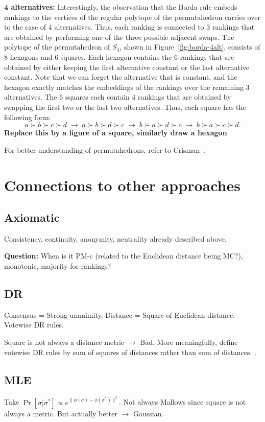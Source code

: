 \documentclass[10pt,letterpaper]{article}
\begin{document}
{\bf $\mathbf{4}$ alternatives:} Interestingly, the observation that the Borda rule embeds rankings to the vertices of the regular polytope of the permutahedron carries over to the case of $4$ alternatives. Thus, each ranking is connected to $3$ rankings that are obtained by performing one of the three possible adjacent swaps. The polytope of the permutahedron of $S_4$, shown in Figure~\ref{fig:borda-4alt}, consists of $8$ hexagons and $6$ squares. Each hexagon contains the $6$ rankings that are obtained by either keeping the first alternative constant or the last alternative constant. Note that we can forget the alternative that is constant, and the hexagon exactly matches the embeddings of the rankings over the remaining $3$ alternatives. The $6$ squares each contain $4$ rankings that are obtained by swapping the first two or the last two alternatives. Thus, each square has the following form: 
$$
a \succ b \succ c \succ d \;\longrightarrow\; a \succ b \succ d \succ c \;\longrightarrow\; b \succ a \succ d \succ c \;\longrightarrow\; b \succ a \succ c \succ d.
$$
{\bf Replace this by a figure of a square, similarly draw a hexagon}

For better understanding of permutahedrons, refer to Crisman~\cite{Crisman}. 


\section{Connections to other approaches}
\subsection{Axiomatic}
Consistency, continuity, anonymity, neutrality already described above. 

{\bf Question:} When is it PM-c (related to the Euclidean distance being MC?), monotonic, majority for rankings?

\subsection{DR}
Consensus = Strong unanimity. Distance = Square of Euclidean distance. Votewise DR rules. 

Square is not always a distance metric $\rightarrow$ Bad. More meaningfully, define votewise DR rules by sum of squares of distances rather than sum of distances. . 

\subsection{MLE}
Take $\Pr[\sigma | \sigma^*] \propto e^{\|\phi(\sigma)-\phi(\sigma^*)\|^2}$. Not always Mallows since square is not always a metric. But actually better $\rightarrow$ Gaussian. 
\end{document}
